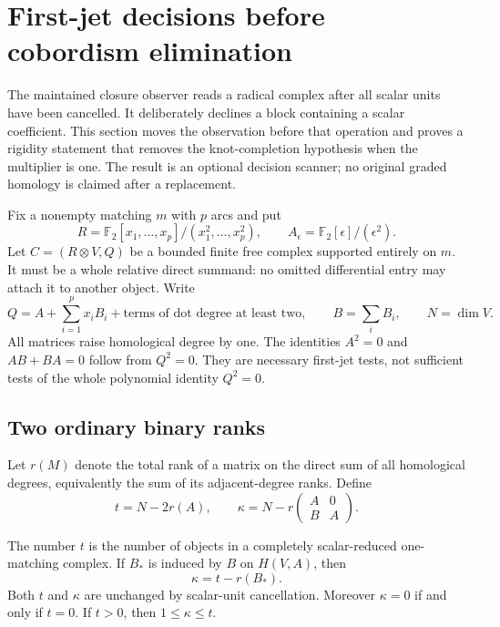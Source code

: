 \section{First-jet decisions before cobordism elimination}
\label{sec:first-jet-pre-schur}

The maintained closure observer reads a radical complex after all scalar
units have been cancelled. It deliberately declines a block containing a
scalar coefficient. This section moves the observation before that operation
and proves a rigidity statement that removes the knot-completion hypothesis
when the multiplier is one. The result is an optional decision scanner;
no original graded homology is claimed after a replacement.

Fix a nonempty matching $m$ with $p$ arcs and put
\[
 R=\mathbb F_2[x_1,\ldots,x_p]/(x_1^2,\ldots,x_p^2),\qquad
 A_\epsilon=\mathbb F_2[\epsilon]/(\epsilon^2).
\]
Let $C=(R\otimes V,Q)$ be a bounded finite free complex supported entirely
on $m$. It must be a whole relative direct summand: no omitted differential
entry may attach it to another object. Write
\[
 Q=A+\sum_{i=1}^p x_i B_i+\text{terms of dot degree at least two},
 \qquad B=\sum_i B_i,\qquad N=\dim V .
\]
All matrices raise homological degree by one. The identities $A^2=0$ and
$AB+BA=0$ follow from $Q^2=0$. They are necessary first-jet tests, not
sufficient tests of the whole polynomial identity $Q^2=0$.

\subsection{Two ordinary binary ranks}

Let $r(M)$ denote the total rank of a matrix on the direct sum of all
homological degrees, equivalently the sum of its adjacent-degree ranks.
Define
\begin{equation}
 t=N-2r(A),\qquad
 \kappa=N-r\begin{pmatrix}A&0\\ B&A\end{pmatrix}.
 \label{eq:first-jet-two-ranks}
\end{equation}

\begin{proposition}
\label{prop:first-jet-invariants}
The number $t$ is the number of objects in a completely scalar-reduced
one-matching complex. If $B_*$ is induced by $B$ on $H(V,A)$, then
\[
 \kappa=t-r(B_*).
\]
Both $t$ and $\kappa$ are unchanged by scalar-unit cancellation. Moreover
$\kappa=0$ if and only if $t=0$. If $t>0$, then $1\le\kappa\le t$.
\end{proposition}


